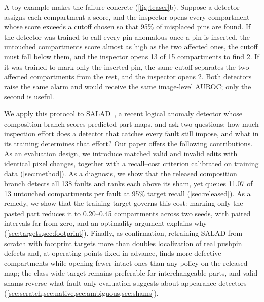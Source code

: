 A toy example makes the failure concrete (\cref{fig:teaser}b). Suppose a detector assigns each compartment a score, and the inspector opens every compartment whose score exceeds a cutoff chosen so that 95\% of misplaced pins are found. If the detector was trained to call every pin anomalous once a pin is inserted, the untouched compartments score almost as high as the two affected ones, the cutoff must fall below them, and the inspector opens 13 of 15 compartments to find 2. If it was trained to mark only the inserted pin, the same cutoff separates the two affected compartments from the rest, and the inspector opens 2. Both detectors raise the same alarm and would receive the same image-level AUROC; only the second is useful.

We apply this protocol to SALAD~\cite{fucka2025}, a recent logical anomaly detector whose composition branch scores predicted part maps, and ask two questions: how much inspection effort does a detector that catches every fault still impose, and what in its training determines that effort? Our paper offers the following contributions. As an evaluation design, we introduce matched valid and invalid edits with identical pixel changes, together with a recall--cost criterion calibrated on training data (\cref{sec:method}). As a diagnosis, we show that the released composition branch detects all 138 faults and ranks each above its sham, yet queues 11.07 of 13 untouched compartments per fault at 95\% target recall (\cref{sec:released}). As a remedy, we show that the training target governs this cost: marking only the pasted part reduces it to 0.20--0.45 compartments across two seeds, with paired intervals far from zero, and an optimality argument explains why (\cref{sec:targets,sec:footprint}). Finally, as confirmation, retraining SALAD from scratch with footprint targets more than doubles localization of real pushpin defects and, at operating points fixed in advance, finds more defective compartments while opening fewer intact ones than any policy on the released map; the class-wide target remains preferable for interchangeable parts, and valid shams reverse what fault-only evaluation suggests about appearance detectors (\cref{sec:scratch,sec:native,sec:ambiguous,sec:shams}).
